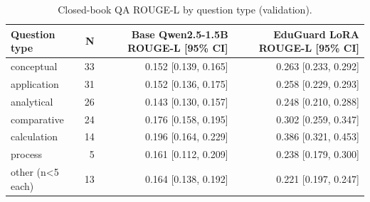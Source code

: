 \begin{table}[t]
\centering
\caption{Closed-book QA ROUGE-L by question type (validation).}
\label{tab:t6_qa_by_type}
\begin{tabular}{lrrr}
\toprule
Question type & N & Base Qwen2.5-1.5B ROUGE-L [95\% CI] & EduGuard LoRA ROUGE-L [95\% CI] \\
\midrule
conceptual & 33 & 0.152 [0.139, 0.165] & 0.263 [0.233, 0.292] \\
application & 31 & 0.152 [0.136, 0.175] & 0.258 [0.229, 0.293] \\
analytical & 26 & 0.143 [0.130, 0.157] & 0.248 [0.210, 0.288] \\
comparative & 24 & 0.176 [0.158, 0.195] & 0.302 [0.259, 0.347] \\
calculation & 14 & 0.196 [0.164, 0.229] & 0.386 [0.321, 0.453] \\
process & 5 & 0.161 [0.112, 0.209] & 0.238 [0.179, 0.300] \\
other (n<5 each) & 13 & 0.164 [0.138, 0.192] & 0.221 [0.197, 0.247] \\
\bottomrule
\end{tabular}
\end{table}
